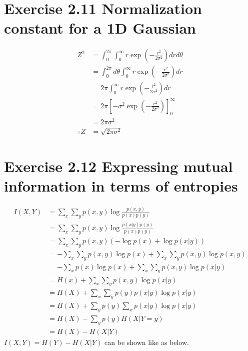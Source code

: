 \documentclass{jsarticle}
\begin{document}
\section*{Exercise 2.11 Normalization constant for a 1D Gaussian}
\begin{align}
Z^2 & = \int_{0}^{2\pi}\int_{0}^{\infty}r\exp(-\frac{r^2}{2\sigma^2})drd\theta\\
& = \int_{0}^{2\pi}d\theta\int_{0}^{\infty}r\exp(-\frac{r^2}{2\sigma^2})dr\\
& = 2\pi \int_{0}^{\infty}r\exp(-\frac{r^2}{2\sigma^2})dr\\
& = 2\pi \left[-\sigma^2\exp(-\frac{r^2}{2\sigma^2})\right]_{0}^{\infty}\\
& = 2\pi\sigma^2\\
\therefore Z & = \sqrt{2\pi \sigma^2}
\end{align}

\section*{Exercise 2.12 Expressing mutual information in terms of entropies}
\begin{align}
I(X,Y) & = \sum_x\sum_yp(x,y)\log\frac{p(x,y)}{p(x)p(y)}\\
& = \sum_x\sum_yp(x,y)\log\frac{p(x|y)p(y)}{p(x)p(y)}\\
& = \sum_x\sum_yp(x,y)(-\log p(x)+\log p(x|y))\\
& = -\sum_x\sum_yp(x,y)\log p(x) + \sum_x\sum_yp(x,y)\log p(x,y)\\
& = -\sum_xp(x)\log p(x) + \sum_x\sum_yp(x,y)\log p(x|y)\\
& = H(x) + \sum_x\sum_yp(x,y)\log p(x|y)\\
& = H(X) + \sum_x\sum_yp(y)p(x|y)\log p(x|y)\\
& = H(X) + \sum_y p(y)\sum_xp(x|y)\log p(x|y)\\
& = H(X) - \sum_y p(y) H(X|Y=y)\\
& = H(X) - H(X|Y)
\end{align}
$I(X,Y)=H(Y)-H(X|Y)$ can be shown like as below.
\end{document}
